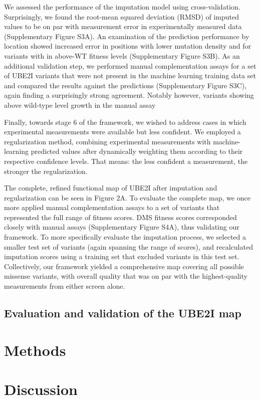 We assessed the performance of the imputation model using cross-validation. Surprisingly, we found the root-mean squared deviation (RMSD) of imputed values to be on par with measurement error in experimentally measured data (Supplementary Figure S3A). An examination of the prediction performance by location showed increased error in positions with lower mutation density and for variants with in above-WT fitness levels (Supplementary Figure S3B). As an additional validation step, we performed manual complementation assays for a set of UBE2I variants that were not present in the machine learning training data set and compared the results against the predictions (Supplementary Figure S3C), again finding a surprisingly strong agreement. Notably however, variants showing above wild-type level growth in the manual assay

Finally, towards stage 6 of the framework, we wished to address cases in which experimental measurements were available but less confident. We employed a regularization method, combining experimental measurements with machine-learning predicted values after dynamically weighting them according to their respective confidence levels. That means: the less confident a measurement, the stronger the regularization. 


The complete, refined functional map of UBE2I after imputation and regularization can be seen in Figure 2A. To evaluate the complete map, we once more applied manual complementation assays to a set of variants that represented the full range of fitness scores.  DMS fitness scores corresponded closely with manual assays (Supplementary Figure S4A), thus validating our framework.  To more specifically evaluate the imputation process, we selected a smaller test set of variants (again spanning the range of scores), and recalculated imputation scores using a training set that excluded variants in this test set.  Collectively, our framework yielded a comprehensive map covering all possible missense variants, with overall quality that was on par with the highest-quality measurements from either screen alone.

\subsection{Evaluation and validation of the UBE2I map}

\section{Methods}

\section{Discussion}

